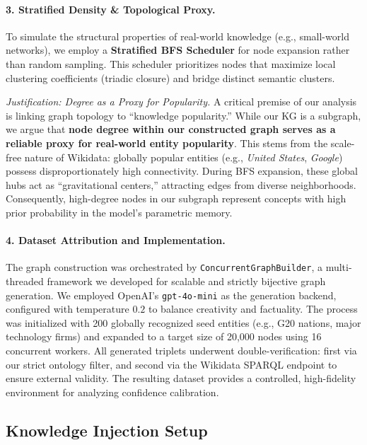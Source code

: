 \paragraph{3. Stratified Density \& Topological Proxy.}
To simulate the structural properties of real-world knowledge (e.g., small-world networks), we employ a \textbf{Stratified BFS Scheduler} for node expansion rather than random sampling. This scheduler prioritizes nodes that maximize local clustering coefficients (triadic closure) and bridge distinct semantic clusters.

\textit{Justification: Degree as a Proxy for Popularity.}
A critical premise of our analysis is linking graph topology to ``knowledge popularity.'' While our KG is a subgraph, we argue that \textbf{node degree within our constructed graph serves as a reliable proxy for real-world entity popularity}. This stems from the scale-free nature of Wikidata: globally popular entities (e.g., \textit{United States}, \textit{Google}) possess disproportionately high connectivity. During BFS expansion, these global hubs act as ``gravitational centers,'' attracting edges from diverse neighborhoods. Consequently, high-degree nodes in our subgraph represent concepts with high prior probability in the model's parametric memory.

\paragraph{4. Dataset Attribution and Implementation.}
The graph construction was orchestrated by \texttt{ConcurrentGraphBuilder}, a multi-threaded framework we developed for scalable and strictly bijective graph generation. We employed OpenAI's \texttt{gpt-4o-mini} as the generation backend, configured with temperature $0.2$ to balance creativity and factuality. The process was initialized with 200 globally recognized seed entities (e.g., G20 nations, major technology firms) and expanded to a target size of 20,000 nodes using 16 concurrent workers. All generated triplets underwent double-verification: first via our strict ontology filter, and second via the Wikidata SPARQL endpoint to ensure external validity. The resulting dataset provides a controlled, high-fidelity environment for analyzing confidence calibration.

\subsection{Knowledge Injection Setup}

